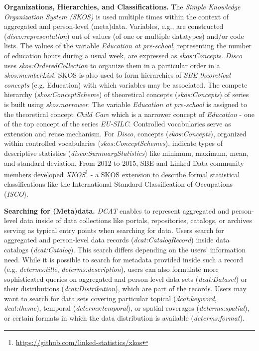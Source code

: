 \documentclass{llncs}
\begin{document}
\textbf{Organizations, Hierarchies, and Classifications.}
The \emph{Simple Knowledge Organization System (SKOS)} is used multiple times within the context of aggregated and person-level (meta)data.
Variables, e.g., are constructed (\emph{disco:representation}) out of values (of one or multiple datatypes) and/or code lists.
The values of the variable \emph{Education at pre-school}, representing the number of education hours during a usual week, are expressed as \emph{skos:Concepts}. 
\emph{Disco} uses \emph{skos:OrderedCollection} to organize them in a particular order in a \emph{skos:memberList}. 
SKOS is also used to form hierarchies of \emph{SBE theoretical concepts} (e.g. Education) with which variables may be associated.
The compete hierarchy (\emph{skos:ConceptScheme}) of theoretical concepts (\emph{skos:Concepts}) of series is built using \emph{skos:narrower}.
The variable \emph{Education at pre-school} is assigned to the theoretical concept \emph{Child Care} which is a narrower concept of \emph{Education} - one of the top concept of the series \emph{EU-SILC}.
Controlled vocabularies serve as extension and reuse mechanism.
For \emph{Disco}, concepts (\emph{skos:Concepts}), organized within controlled vocabularies (\emph{skos:ConceptSchemes}), indicate types of descriptive statistics (\emph{\emph{disco:SummaryStatistics}}) like minimum, maximum, mean, and standard deviation.
From 2012 to 2015, SBE and Linked Data community members developed \emph{XKOS}\footnote{\url{https://github.com/linked-statistics/xkos}} - a SKOS extension to describe formal statistical classifications like the International Standard Classification of Occupations (\emph{ISCO}). 

\textbf{Searching for (Meta)data.}
\emph{DCAT} enables to represent aggregated and person-level data inside of data collections like portals, repositories, catalogs, or archives
serving as typical entry points when searching for data.
Users search for aggregated and person-level data records (\emph{dcat:CatalogRecord}) inside data catalogs (\emph{dcat:Catalog}). 
This search differs depending on the users’ information need. 
While it is possible to search for metadata provided inside such a record (e.g. \emph{dcterms:title}, \emph{dcterms:description}), 
users can also formulate more sophisticated queries on aggregated and person-level data sets (\emph{dcat:Dataset}) or their
distributions (\emph{dcat:Distribution}), which are part of the records. 
Users may want to search for data sets covering particular topical (\emph{dcat:keyword}, \emph{dcat:theme}), temporal (\emph{dcterms:temporal}),  or  spatial  coverages (\emph{dcterms:spatial}), 
or certain formats in which the data distribution is available (\emph{dcterms:format}). 
\end{document}
